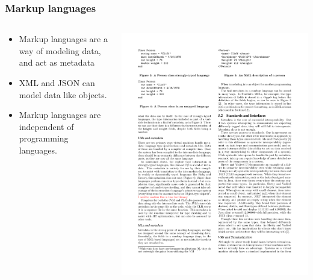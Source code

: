 \documentclass{beamer}
\begin{document}
\begin{frame}
  \frametitle{Markup languages}
  
  \begin{columns}
  \begin{column}{0.5\textwidth}
  \begin{itemize}
	\item Markup languages are a way of modeling data, and act as metadata
	\item XML and JSON can model data like objects.
	\item Markup languages are independent of programming languages.
  \end{itemize}
  \end{column}

  \begin{column}{0.55\textwidth}
   \includegraphics[scale=1]{graphics/XMLCliff.pdf}
   

\end{column}
\end{columns}
\end{frame}
\end{document}
